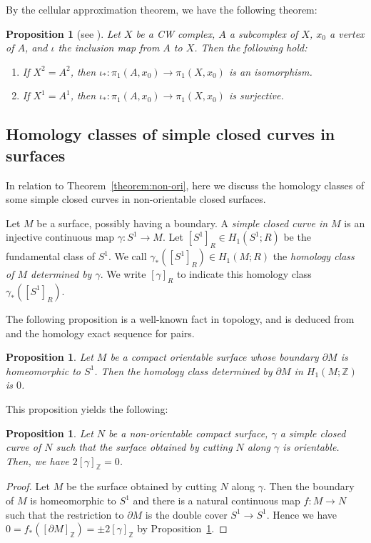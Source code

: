 \documentclass[11pt, amsfonts]{amsart}
\numberwithin{equation}{section}
\newtheorem{proposition}[thm]{Proposition}
\theoremstyle{definition}
\theoremstyle{remark}
\newcommand{\ZZ}{\mathbb{Z}}
\begin{document}
By the cellular approximation theorem, we have the following theorem:

\begin{proposition}[{see \cite[Corollary~4.12]{Hatcher}}] \label{proposition 2-connected}
Let $X$ be a CW complex, $A$ a subcomplex of $X$, $x_0$ a vertex of $A$, and $\iota$ the inclusion map from $A$ to $X$. Then the following hold:
\begin{enumerate}[(1)]
\item If $X^2 = A^2$, then $\iota_* \colon \pi_1(A,x_0) \to \pi_1(X,x_0)$ is an isomorphism.

\item If $X^1 = A^1$, then $\iota_* \colon \pi_1(A,x_0) \to \pi_1(X,x_0)$ is surjective.
\end{enumerate}
\end{proposition}



\subsection{Homology classes of simple closed curves in surfaces}

In relation to Theorem~\ref{theorem:non-ori}, here we discuss the homology classes of some simple closed curves in non-orientable closed surfaces.

Let $M$ be a surface, possibly having a boundary. A \emph{simple closed curve in $M$} is an injective continuous map $\gamma \colon S^1 \to M$. Let $[S^1]_R \in H_1(S^1; R)$ be the fundamental class of $S^1$. We call $\gamma_*([S^1]_R) \in H_1(M; R)$ the \emph{homology class of $M$ determined by $\gamma$}. We write $[\gamma]_R$ to indicate this homology class $\gamma_*([S^1]_R)$.

The following proposition is a well-known fact in topology, and is deduced from \cite[Exercise~31 of Section~3.3]{Hatcher} and the homology exact sequence for pairs.

\begin{proposition} \label{proposition orientable}
Let $M$ be a compact orientable surface whose boundary $\partial M$ is homeomorphic to $S^1$. Then the homology class determined by $\partial M$ in $H_1(M; \ZZ)$ is $0$.
\end{proposition}

This proposition yields the following:

\begin{proposition} \label{proposition cut}
Let $N$ be a non-orientable compact surface, $\gamma$ a simple closed curve of $N$ such that the surface obtained by cutting $N$ along $\gamma$ is orientable. Then, we have $2[\gamma]_{\ZZ} = 0$.
\end{proposition}
\begin{proof}
Let $M$ be the surface obtained by cutting $N$ along $\gamma$. Then the boundary of $M$ is homeomorphic to $S^1$ and there is a natural continuous map $f \colon M \to N$ such that the restriction to $\partial M$ is the double cover $S^1 \to S^1$. Hence we have $0 = f_* ([\partial M]_{\ZZ}) = \pm 2  [\gamma]_{\ZZ}$ by Proposition~\ref{proposition orientable}.
\end{proof}
\end{document}
